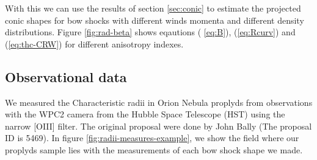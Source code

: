 With this we can use the results of section \ref{sec:conic} to estimate the projected conic shapes for bow shocks with different winds 
momenta and different density distributions. Figure \ref{fig:rad-beta} shows  eqautions  ( \ref{eq:B}), (\ref{eq:Rcurv}) and (\ref{eq:thc-CRW}) for different anisotropy indexes. 




 
\subsection{Observational data}

We measured the Characteristic radii in Orion Nebula proplyds from observations with the WPC2 camera from the Hubble Space Telescope (HST) using the narrow [OIII] filter. The original proposal were done by John Bally (The proposal ID is 5469). In figure \ref{fig:radii-measures-example}, we show the field where our proplyds sample lies with the measurements of each bow shock shape we made.

